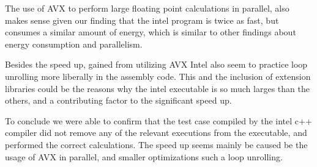 The use of AVX to perform large floating point calculations in parallel, also makes sense given our finding that the intel program is twice as fast, but consumes a similar amount of energy, which is similar to other findings about energy consumption and parallelism\cite{Lindholt2022}.

Besides the speed up, gained from utilizing AVX Intel also seem to practice loop unrolling more liberally in the assembly code. This and the inclusion of extension libraries could be the reasons why the intel executable is so much larges than the others, and a contributing factor to the significant speed up.

To conclude we were able to confirm that the test case compiled by the intel c++ compiler did not remove any of the relevant executions from the executable, and performed the correct calculations. The speed up seems mainly be caused be the usage of AVX in parallel, and smaller optimizations such a loop unrolling.





